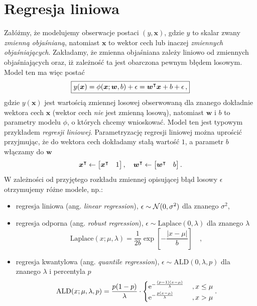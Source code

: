 \documentclass{myclass}
\begin{document}
\section{Regresja liniowa}

Załóżmy, że modelujemy obserwacje postaci \((y, \bm{x})\), gdzie \(y\) to skalar zwany \emph{zmienną
objaśnianą}, natomiast \(\bm{x}\) to wektor cech lub inaczej \emph{zmiennych objaśniających}.
Zakładamy, że zmienna objaśniana zależy liniowo od zmiennych objaśniających oraz, iż zależność ta
jest obarczona pewnym błędem losowym. Model ten ma więc postać
\[
\boxed{
    y(\bm{x}) = \phi(\bm{x}; \bm{w}, b) + \epsilon = \bm{w}^\intercal \bm{x} + b + \epsilon\,,
}
\]
gdzie \(y(\bm{x})\) jest wartością zmiennej losowej obserwowaną dla znanego dokładnie wektora cech
\(\bm{x}\) (wektor cech \emph{nie} jest zmienną losową), natomiast \(\bm{w}\) i \(b\) to parametry
modelu \(\phi\), o których chcemy wnioskować. Model ten jest typowym przykładem \emph{regresji
liniowej}. Parametryzację regresji liniowej można uprościć przyjmując, że do wektora cech dokładamy
stałą wartość \(1\), a parametr \(b\) włączamy do \(\bm{w}\)
\[
    \bm{x}^\tpose \gets \mqty[\bm{x}^\tpose & 1]\,,\quad \bm{w}^\tpose \gets \mqty[\bm{w}^\tpose & b] \,.
\]
W zależności od przyjętego rozkładu zmiennej opisującej błąd losowy \(\epsilon\) otrzymujemy różne
modele, np.:
\begin{itemize}
    \item regresja liniowa (ang. \emph{linear regression}), \(\epsilon \sim \mathcal{N}(0, \sigma^2)\)
    dla znanego \(\sigma^2\),

    \item regresja odporna (ang. \emph{robust regression}), \(\epsilon \sim \text{Laplace}(0,
    \lambda)\) dla znanego \(\lambda\)
    \[
        \text{Laplace}(x; \mu, \lambda) = \frac{1}{2b} \exp\left[- \frac{|x - \mu|}{b}\right]\quad,
    \]
    \item regresja kwantylowa (ang. \emph{quantile regression}), \(\epsilon \sim \text{ALD}(0,
    \lambda, p)\) dla znanego \(\lambda\) i percentyla \(p\)
    \[
        \text{ALD}(x; \mu, \lambda, p) = \frac{p(1-p)}{\lambda} \cdot \begin{cases}
                \displaystyle \mathrm{e}^{-\frac{(p-1)(x-\mu)}{\lambda}} &\,, x \leq \mu\\
                \displaystyle \mathrm{e}^{-\frac{p (x - \mu)}{\lambda}}  &\,, x > \mu
        \end{cases}.
    \]  
\end{itemize}
\end{document}

